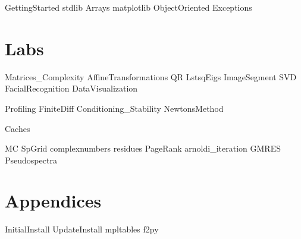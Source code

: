 \documentclass[nociteref]{SIAM-GH-book}
\begin{document}
{GettingStarted}
{stdlib}
{Arrays}
{matplotlib}
{ObjectOriented}
{Exceptions}

\part{Labs}
{Matrices_Complexity}
{AffineTransformations}
{QR}
{LstsqEigs}
{ImageSegment}
{SVD}
{FacialRecognition}
{DataVisualization}


{Profiling}
{FiniteDiff}
{Conditioning_Stability}
{NewtonsMethod}



{Caches}

{MC}
{SpGrid}
{complexnumbers}
{residues}
{PageRank}
{arnoldi_iteration}
{GMRES}
{Pseudospectra}


\part{Appendices}
\begin{appendices}
{InitialInstall}
{UpdateInstall}
{mpltables}
{f2py}
\end{appendices}
\end{document}
